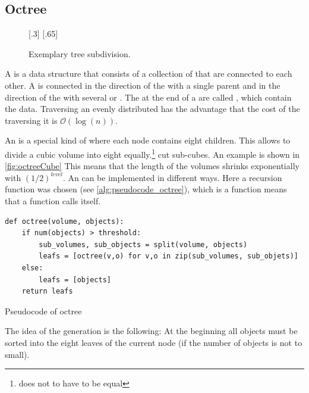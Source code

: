 \subsection{Octree}
%
\begin{figure}[!t]
    \centering
    [.3\textwidth]{
    \def\tikzheight{0.6\textwidth}
    }
    \hfill
    [.65\textwidth]{
    \def\tikzheight{0.6\textwidth}
    }
	\caption{Exemplary tree subdivision.}
	\label{fig:octree}
\end{figure}
%
A  is a data structure that consists of a collection of  that are connected to each other.
A  is connected in the direction of the  with a single parent  and in the direction of the  with several  or .
The  at the end of a  are called , which contain the data.
Traversing an evenly distributed  has the advantage that the cost of the traversing it is $\mathcal{O}(\log(n))$.
\par
%
An  is a special kind of  where each node contains eight children.
This allows to divide a cubic volume into eight equally.\footnote{does not to have to be equal} cut sub-cubes.
An example is shown in \cref{fig:octreeCube}
This means that the length of the volumes shrinks exponentially with $(1/2)^\mathit{level}$.
An  can be implemented in different ways.
Here a recursion function was chosen (see \cref{alg:pseudocode_octree}), which is a function means that a function calls itself.
%
\begin{lstfloat}[!tb]
\lstset{style=python}
\begin{lstlisting}[]
def octree(volume, objects):
    if num(objects) > threshold:
        sub_volumes, sub_objects = split(volume, objects)
        leafs = [octree(v,o) for v,o in zip(sub_volumes, sub_objets)]
    else:
        leafs = [objects]
    return leafs
\end{lstlisting}
\caption{Pseudocode of octree}
\label{alg:pseudocode_octree}
\end{lstfloat}
%
The idea of the  generation is the following:
At the beginning all objects must be sorted into the eight leaves of the current node (if the number of objects is not to small).
